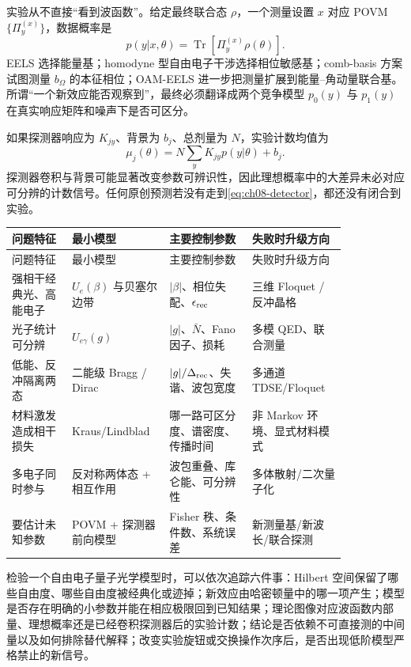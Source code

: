 实验从不直接“看到波函数”。给定最终联合态 $\rho$，一个测量设置 $x$ 对应 POVM $\{\Pi_y^{(x)}\}$，数据概率是
\begin{equation}
p(y|x,\theta)=\operatorname{Tr}[\Pi_y^{(x)}\rho(\theta)].
\label{eq:ch08-born}
\end{equation}
EELS 选择能量基；homodyne 型自由电子干涉选择相位敏感基；comb-basis 方案试图测量 $b_\Omega$ 的本征相位；OAM-EELS 进一步把测量扩展到能量--角动量联合基。所谓“一个新效应能否观察到”，最终必须翻译成两个竞争模型 $p_0(y)$ 与 $p_1(y)$ 在真实响应矩阵和噪声下是否可区分。

如果探测器响应为 $K_{jy}$、背景为 $b_j$、总剂量为 $N$，实验计数均值为
\begin{equation}
\mu_j(\theta)=N\sum_yK_{jy}p(y|\theta)+b_j.
\label{eq:ch08-detector}
\end{equation}
探测器卷积与背景可能显著改变参数可辨识性，因此理想概率中的大差异未必对应可分辨的计数信号。任何原创预测若没有走到\cref{eq:ch08-detector}，都还没有闭合到实验。


\begin{longtable}{p{0.16\linewidth}p{0.21\linewidth}p{0.22\linewidth}p{0.25\linewidth}}
\toprule
问题特征 & 最小模型 & 主要控制参数 & 失败时升级方向\\
\midrule
\endfirsthead
\toprule
问题特征 & 最小模型 & 主要控制参数 & 失败时升级方向\\
\midrule
\endhead
强相干经典光、高能电子 & $U_e(\beta)$ 与贝塞尔边带 & $|\beta|$、相位失配、$\epsilon_{\rm rec}$ & 三维 Floquet / 反冲晶格\\
光子统计可分辨 & $U_{e\gamma}(g)$ & $|g|$、$\bar N$、Fano 因子、损耗 & 多模 QED、联合测量\\
低能、反冲隔离两态 & 二能级 Bragg / Dirac & $|g|/\Delta_{\rm rec}$、失谐、波包宽度 & 多通道 TDSE/Floquet\\
材料激发造成相干损失 & Kraus/Lindblad & 哪一路可区分度、谱密度、传播时间 & 非 Markov 环境、显式材料模式\\
多电子同时参与 & 反对称两体态 + 相互作用 & 波包重叠、库仑能、可分辨性 & 多体散射/二次量子化\\
要估计未知参数 & POVM + 探测器前向模型 & Fisher 秩、条件数、系统误差 & 新测量基/新波长/联合探测\\
\bottomrule
\end{longtable}

检验一个自由电子量子光学模型时，可以依次追踪六件事：Hilbert 空间保留了哪些自由度、哪些自由度被经典化或迹掉；新效应由哈密顿量中的哪一项产生；模型是否存在明确的小参数并能在相应极限回到已知结果；理论图像对应波函数内部量、理想概率还是已经卷积探测器后的实验计数；结论是否依赖不可直接测的中间量以及如何排除替代解释；改变实验旋钮或交换操作次序后，是否出现低阶模型严格禁止的新信号。

